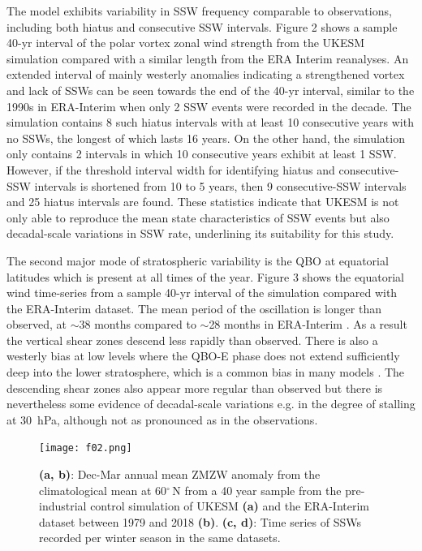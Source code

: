 The model exhibits variability in SSW frequency comparable to observations, including both hiatus and consecutive SSW intervals. Figure 2 shows a sample 40-yr interval of the polar vortex zonal wind strength from the UKESM simulation compared with a similar length from the ERA Interim reanalyses. An extended interval of mainly westerly anomalies indicating a strengthened vortex and lack of SSWs can be seen towards the end of the 40-yr interval, similar to the 1990s in ERA-Interim when only 2 SSW events were recorded in the decade. The simulation contains 8 such hiatus intervals with at least 10 consecutive years with no SSWs, the longest of which lasts 16 years. On the other hand, the simulation only contains 2 intervals in which 10 consecutive years exhibit at least 1 SSW. However, if the threshold interval width for identifying hiatus and consecutive-SSW intervals is shortened from 10 to 5 years,  then 9 consecutive-SSW intervals and 25 hiatus intervals are found. These statistics indicate that UKESM is not only able to reproduce the mean state characteristics of SSW events but also decadal-scale variations in SSW rate, underlining its  suitability for this study. 

The second major mode of stratospheric variability is the QBO at equatorial latitudes which is present at all times of the year. Figure 3 shows the equatorial wind time-series from a sample 40-yr interval of the simulation compared with the ERA-Interim dataset. The mean period of the oscillation is longer than observed, at $\sim$38 months compared to $\sim$28 months in ERA-Interim \citep{Kawatani2016}. As a result the vertical shear zones descend less rapidly than observed. There is also a westerly bias at low levels where the QBO-E phase does not extend sufficiently deep into the lower stratosphere, which is a common bias in many models \citep{Bushell2020}. The descending shear zones also appear more regular than observed but there is nevertheless some evidence of decadal-scale variations e.g. in the degree of stalling at 30\ hPa, although not as pronounced as in the observations.

\begin{center}
\begin{figure}[h!]
\noindent\texttt{[image: f02.png]}
\caption{\textbf{(a, b)}: Dec-Mar annual mean ZMZW anomaly from the climatological mean at 60$^\circ$\,N from a 40 year sample from the pre-industrial control simulation of UKESM \textbf{(a)} and the ERA-Interim dataset between 1979 and 2018 \textbf{(b)}. \textbf{(c, d)}: Time series of SSWs recorded per winter season in the same datasets.}
\label{fig1}
\end{figure}
\end{center}

